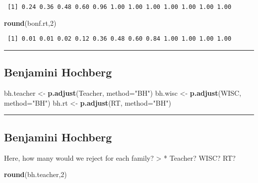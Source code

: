 \documentclass[]{article}
\newenvironment{Shaded}{\begin{snugshade}}{\end{snugshade}}
\newcommand{\DataTypeTok}[1]{\textcolor[rgb]{0.13,0.29,0.53}{#1}}
\newcommand{\DecValTok}[1]{\textcolor[rgb]{0.00,0.00,0.81}{#1}}
\newcommand{\KeywordTok}[1]{\textcolor[rgb]{0.13,0.29,0.53}{\textbf{#1}}}
\newcommand{\NormalTok}[1]{#1}
\newcommand{\StringTok}[1]{\textcolor[rgb]{0.31,0.60,0.02}{#1}}
\begin{document}
\begin{verbatim}
 [1] 0.24 0.36 0.48 0.60 0.96 1.00 1.00 1.00 1.00 1.00 1.00 1.00
\end{verbatim}

\begin{Shaded}
\begin{Highlighting}[]
\KeywordTok{round}\NormalTok{(bonf.rt,}\DecValTok{2}\NormalTok{)}
\end{Highlighting}
\end{Shaded}

\begin{verbatim}
 [1] 0.01 0.01 0.02 0.12 0.36 0.48 0.60 0.84 1.00 1.00 1.00 1.00
\end{verbatim}

\begin{center}\rule{0.5\linewidth}{\linethickness}\end{center}

\hypertarget{benjamini-hochberg}{%
\subsection{Benjamini Hochberg}\label{benjamini-hochberg}}

\begin{Shaded}
\begin{Highlighting}[]
\NormalTok{bh.teacher <-}\StringTok{ }\KeywordTok{p.adjust}\NormalTok{(Teacher, }\DataTypeTok{method=}\StringTok{"BH"}\NormalTok{)}
\NormalTok{bh.wisc <-}\StringTok{ }\KeywordTok{p.adjust}\NormalTok{(WISC, }\DataTypeTok{method=}\StringTok{"BH"}\NormalTok{)}
\NormalTok{bh.rt <-}\StringTok{ }\KeywordTok{p.adjust}\NormalTok{(RT, }\DataTypeTok{method=}\StringTok{"BH"}\NormalTok{)}
\end{Highlighting}
\end{Shaded}

\begin{center}\rule{0.5\linewidth}{\linethickness}\end{center}

\hypertarget{benjamini-hochberg-1}{%
\subsection{Benjamini Hochberg}\label{benjamini-hochberg-1}}

Here, how many would we reject for each family? \textgreater{} *
Teacher? WISC? RT?

\begin{Shaded}
\begin{Highlighting}[]
\KeywordTok{round}\NormalTok{(bh.teacher,}\DecValTok{2}\NormalTok{)}
\end{Highlighting}
\end{Shaded}
\end{document}
